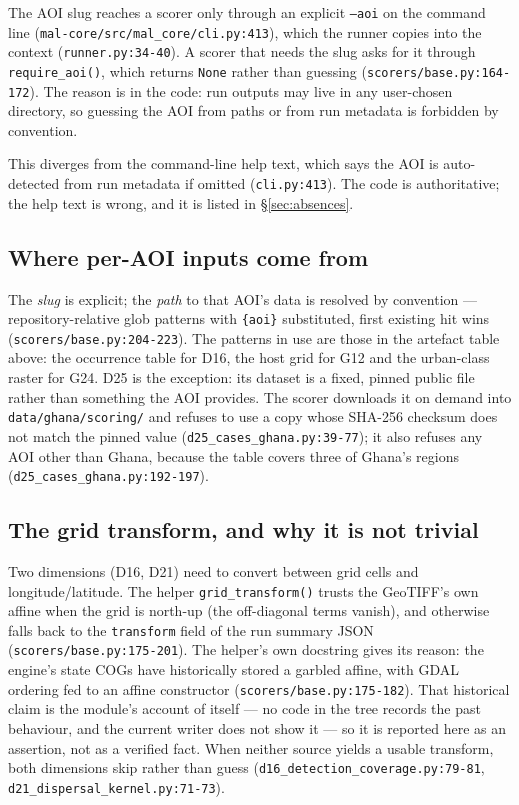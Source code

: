 \documentclass[11pt,a4paper]{article}
\newcommand{\code}[1]{\texttt{#1}}
\begin{document}
The AOI slug reaches a scorer only through an explicit \code{--aoi} on the
command line (\code{mal-core/src/mal\_core/cli.py:413}), which the runner
copies into the context (\code{runner.py:34-40}). A scorer that needs the
slug asks for it through \code{require\_aoi()}, which returns \code{None}
rather than guessing (\code{scorers/base.py:164-172}). The reason is in the
code: run outputs may live in any user-chosen directory, so guessing the
AOI from paths or from run metadata is forbidden by convention.

This diverges from the command-line help text, which says the AOI is
auto-detected from run metadata if omitted (\code{cli.py:413}). The code is
authoritative; the help text is wrong, and it is listed in
\S\ref{sec:absences}.

\subsection{Where per-AOI inputs come from}

The \emph{slug} is explicit; the \emph{path} to that AOI's data is resolved
by convention --- repository-relative glob patterns with
\texttt{\{aoi\}} substituted, first existing hit wins
(\code{scorers/base.py:204-223}). The patterns in use are those in the
artefact table above: the occurrence table for D16, the host grid for G12
and the urban-class raster for G24. D25 is the exception: its dataset is a
fixed, pinned public file rather than something the AOI provides. The
scorer downloads it on demand into \code{data/ghana/scoring/} and refuses
to use a copy whose SHA-256 checksum does not match the pinned value
(\code{d25\_cases\_ghana.py:39-77}); it also refuses any AOI other than
Ghana, because the table covers three of Ghana's regions
(\code{d25\_cases\_ghana.py:192-197}).

\subsection{The grid transform, and why it is not trivial}

Two dimensions (D16, D21) need to convert between grid cells and
longitude/latitude. The helper \code{grid\_transform()} trusts the
GeoTIFF's own affine when the grid is north-up (the off-diagonal terms
vanish), and otherwise falls back to the \code{transform} field of the run
summary JSON (\code{scorers/base.py:175-201}). The helper's own docstring
gives its reason: the engine's state COGs have historically stored a
garbled affine, with GDAL ordering fed to an affine constructor
(\code{scorers/base.py:175-182}). That historical claim is the module's
account of itself --- no code in the tree records the past behaviour, and
the current writer does not show it --- so it is reported here as an
assertion, not as a verified fact. When neither source yields a
usable transform, both dimensions skip rather than guess
(\code{d16\_detection\_coverage.py:79-81},
\code{d21\_dispersal\_kernel.py:71-73}).
\end{document}
